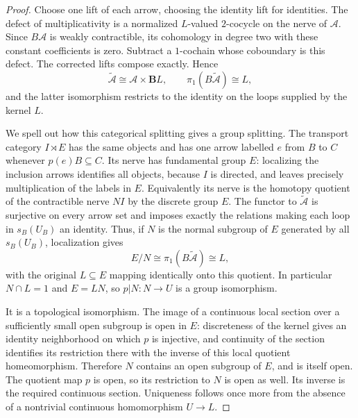 \begin{proof}
Choose one lift of each arrow, choosing the identity lift for
identities. The defect of multiplicativity is a normalized
$L$-valued $2$-cocycle on the nerve of $\mathcal A$.
Since $B\mathcal A$ is weakly contractible, its cohomology in
degree two with these constant coefficients is zero. Subtract
a $1$-cochain whose coboundary is this defect. The corrected
lifts compose exactly. Hence
\[
 \widetilde{\mathcal A}\cong\mathcal A\times\mathbf B L,
 \qquad
 \pi_1(B\widetilde{\mathcal A})\cong L,
\]
and the latter isomorphism restricts to the identity on the
loops supplied by the kernel $L$.

We spell out how this categorical splitting gives a group
splitting. The transport category $I\rtimes E$ has the same
objects and has one arrow labelled $e$ from $B$ to $C$ whenever
$p(e)B\subseteq C$. Its nerve has fundamental group $E$:
localizing the inclusion arrows identifies all objects, because
$I$ is directed, and leaves precisely multiplication of the
labels in $E$. Equivalently its nerve is the homotopy quotient
of the contractible nerve $NI$ by the discrete group $E$.
The functor to $\widetilde{\mathcal A}$ is surjective on every
arrow set and imposes exactly the relations making each loop
in $s_B(U_B)$ an identity. Thus, if $N$ is the normal subgroup
of $E$ generated by all $s_B(U_B)$, localization gives
\[
 E/N\cong\pi_1(B\widetilde{\mathcal A})\cong L,
\]
with the original $L\subseteq E$ mapping identically onto this
quotient. In particular $N\cap L=1$ and $E=LN$, so
$p|N:N\to U$ is a group isomorphism.

It is a topological isomorphism. The image of a continuous local
section over a sufficiently small open subgroup is open in $E$:
discreteness of the kernel gives an identity neighborhood on
which $p$ is injective, and continuity of the section identifies
its restriction there with the inverse of this local quotient
homeomorphism. Therefore $N$ contains an open subgroup of $E$,
and is itself open. The quotient map $p$ is open, so its
restriction to $N$ is open as well. Its inverse is the required
continuous section. Uniqueness follows once more from the
absence of a nontrivial continuous homomorphism $U\to L$.


\end{proof}
